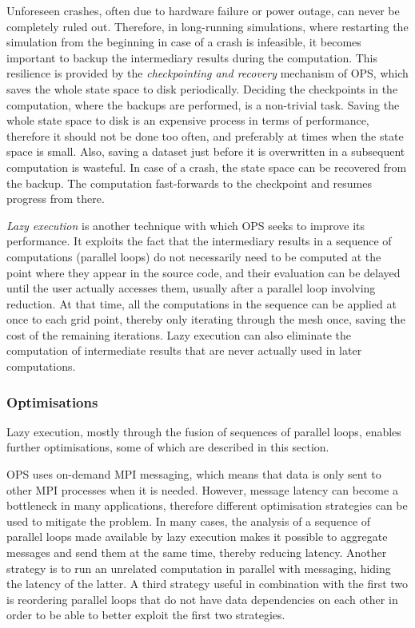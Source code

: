 \documentclass[fontsize=11pt, appendixprefix=true]{scrreprt}
\begin{document}
Unforeseen crashes, often due to hardware failure or power outage, can never be
completely ruled out. Therefore, in long-running simulations, where restarting
the simulation from the beginning in case of a crash is infeasible, it becomes
important to backup the intermediary results during the computation. This
resilience is provided by the \textit{checkpointing and recovery} mechanism of
OPS, which saves the whole state space to disk periodically. Deciding the
checkpoints in the computation, where the backups are performed, is a
non-trivial task. Saving the whole state space to disk is an expensive process
in terms of performance, therefore it should not be done too often, and
preferably at times when the state space is small. Also, saving a dataset just
before it is overwritten in a subsequent computation is wasteful. In case of a
crash, the state space can be recovered from the backup. The computation
fast-forwards to the checkpoint and resumes progress from there.

\textit{Lazy execution} is another technique with which OPS seeks to improve its
performance. It exploits the fact that the intermediary results in a sequence of
computations (parallel loops) do not necessarily need to be computed at the
point where they appear in the source code, and their evaluation can be delayed
until the user actually accesses them, usually after a parallel loop involving
reduction. At that time, all the computations in the sequence can be applied at
once to each grid point, thereby only iterating through the mesh once, saving
the cost of the remaining iterations. Lazy execution can also eliminate the
computation of intermediate results that are never actually used in later
computations.

\subsubsection{Optimisations}

Lazy execution, mostly through the fusion of sequences of parallel loops,
enables further optimisations, some of which are described in this section.

OPS uses on-demand MPI messaging, which means that data is only sent to other
MPI processes when it is needed. However, message latency can become a
bottleneck in many applications, therefore different optimisation strategies can
be used to mitigate the problem. In many cases, the analysis of a sequence of
parallel loops made available by lazy execution makes it possible to aggregate
messages and send them at the same time, thereby reducing latency. Another
strategy is to run an unrelated computation in parallel with messaging, hiding
the latency of the latter. A third strategy useful in combination with the first
two is reordering parallel loops that do not have data dependencies on each
other in order to be able to better exploit the first two strategies.
\end{document}
